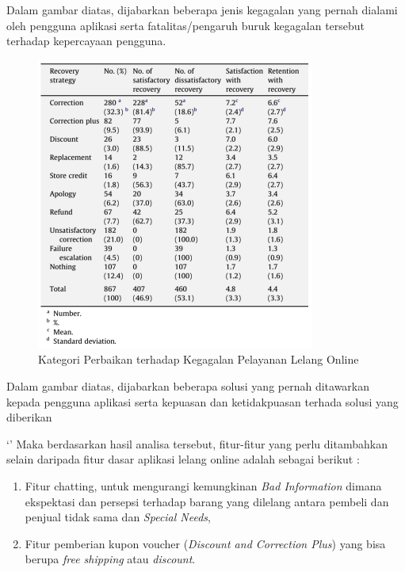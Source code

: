       Dalam gambar diatas, dijabarkan beberapa jenis kegagalan yang pernah dialami oleh pengguna aplikasi serta fatalitas/pengaruh buruk kegagalan tersebut terhadap kepercayaan pengguna. 
      
	  \begin{figure}[H]
        \centering
        \includegraphics[width=\linewidth]{images/bab3/Solusi-Perbaikan-Ketidakpuasan.png}
        \caption{Kategori Perbaikan terhadap Kegagalan Pelayanan Lelang Online}
        \label{service-recovery-strategies}
      \end{figure}
      
      Dalam gambar diatas, dijabarkan beberapa solusi yang pernah ditawarkan kepada pengguna aplikasi serta kepuasan dan ketidakpuasan terhada solusi yang diberikan
      
      
`'      Maka berdasarkan hasil analisa tersebut, fitur-fitur yang perlu ditambahkan selain daripada fitur dasar aplikasi lelang online adalah sebagai berikut :
      \begin{enumerate}
      \item Fitur chatting, untuk mengurangi kemungkinan \textit{Bad Information} dimana ekspektasi dan persepsi terhadap barang yang dilelang antara pembeli dan penjual tidak sama dan \textit{Special Needs}, 
      \item Fitur pemberian kupon voucher (\textit{Discount and Correction Plus}) yang bisa berupa \textit{free shipping} atau \textit{discount}.
      \end{enumerate}
  
